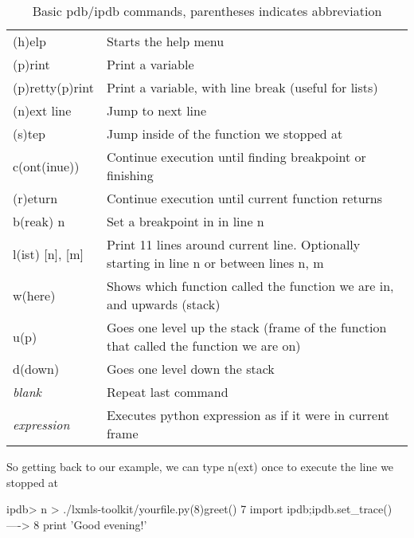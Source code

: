 \begin{table}[!h]
\begin{center}
\begin{tabular}{|l|l|}
\hline
(h)elp           & Starts the help menu\\
(p)rint          & Print a variable\\
(p)retty(p)rint	 & Print a variable, with line break (useful for lists)\\
\hline
(n)ext line      & Jump to next line\\ 
(s)tep           & Jump inside of the function we stopped at\\
c(ont(inue))     & Continue execution until finding breakpoint or finishing\\
(r)eturn         & Continue execution until current function returns\\
b(reak) n        & Set a breakpoint in in line n\\
\hline
l(ist) [n], [m]  & Print 11 lines around current line. Optionally starting in line n or between lines n, m\\
w(here)          & Shows which function called the function we are in, and upwards (stack\footnotemark)\\
u(p)             & Goes one level up the stack (frame of the function that called the function we are on)\\
d(down)          & Goes one level down the stack\\
\hline
\textit{blank}          & Repeat last command\\ 
\textit{expression}     & Executes python expression as if it were in current frame\\
\hline
\end{tabular}
\end{center}
\caption{\label{tb::pdbbasiccommands}Basic pdb/ipdb commands, parentheses indicates abbreviation}
\end{table}


So getting back to our example, we can type n(ext) once to execute the line we stopped at

\begin{python}
ipdb> n
> ./lxmls-toolkit/yourfile.py(8)greet()
      7                 import ipdb;ipdb.set_trace()
----> 8                 print 'Good evening!' 
\end{python}

